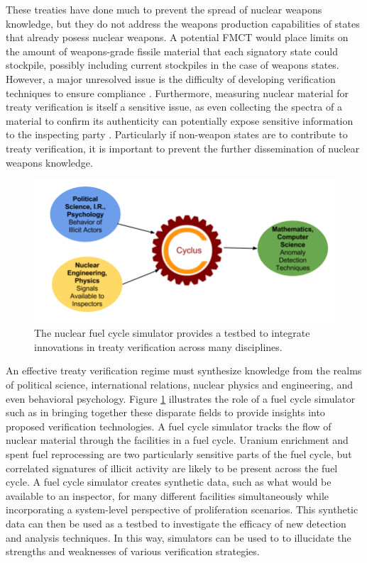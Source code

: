 These treaties have done much to prevent the spread of nuclear weapons knowledge, but they do not address the weapons production capabilities of states that already posess nuclear weapons.  A potential \gls{FMCT} would place limits on the amount of weapons-grade fissile material that each signatory state could stockpile, possibly including current stockpiles in the case of weapons states.  However, a major unresolved issue is the difficulty of developing verification techniques to ensure compliance \cite{_fissile_2013}.  Furthermore, measuring nuclear material for treaty verification is itself a sensitive issue, as even collecting the spectra of a material to confirm its authenticity can potentially expose sensitive information to the inspecting party \cite{glaser_zero-knowledge_2014}. Particularly if non-weapon states are to contribute to treaty verification, it is important to prevent the further dissemination of nuclear weapons knowledge.

\begin{figure}%
\begin{center}
\includegraphics[natwidth=162bp,natheight=227bp, scale=0.45]{./figs/cyclus_interdiscipline.png}
\end{center}
\caption{The \Cyclus nuclear fuel cycle simulator provides a testbed to integrate innovations in treaty verification across many disciplines.}
\label{fig:cyclus_diagram}
\end{figure}

An effective treaty verification regime must synthesize knowledge from the realms of political science, international relations, nuclear physics and engineering, and even behavioral psychology.  Figure \ref{fig:cyclus_diagram} illustrates  the role of a fuel cycle simulator such as \Cyclus in bringing together these disparate fields to provide insights into proposed verification technologies. A fuel cycle simulator tracks the flow of nuclear material through the facilities in a fuel cycle.  Uranium enrichment and spent fuel reprocessing are two particularly sensitive parts of the fuel cycle, but correlated signatures of illicit activity are likely to be present across the fuel cycle. A fuel cycle simulator creates synthetic data, such as what would be available to an inspector, for many different facilities simultaneously while incorporating a system-level perspective of proliferation scenarios. This synthetic data can then be used as a testbed to investigate the efficacy of new detection and analysis techniques. In this way, simulators can be used to  to illucidate the strengths and weaknesses of various verification strategies.